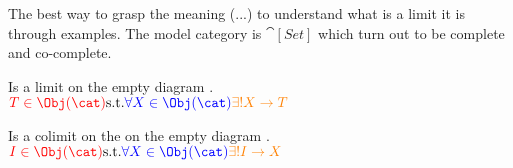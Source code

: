 \documentclass[preview]{standalone}
\begin{document}
%
The best way to grasp the meaning (...) to understand what is a limit it is through examples. The model category is $\cat[Set]$ which turn out to be complete and co-complete.



\begin{minipage}[t]{0.5\textwidth}
\begin{definition}
	Is a limit on the empty diagram .\\
	$\textcolor{red}{T\in \Obj(\cat)} \St 
	 \textcolor{blue}{\forall X \in \Obj	(\cat)}
	 \textcolor{orange}{\exists! X\rightarrow T}$\\
	 
\end{definition}
\end{minipage}
\vrule{}
\begin{minipage}[t]{0.5\textwidth}
\begin{definition}
	Is a colimit on the on the empty diagram .\\
	$\textcolor{red}{I\in \Obj(\cat)} \St 
	 \textcolor{blue}{\forall X \in \Obj	(\cat)}
	 \textcolor{orange}{\exists! I\rightarrow X}$\\


\end{definition}
\end{minipage}
\end{document}
